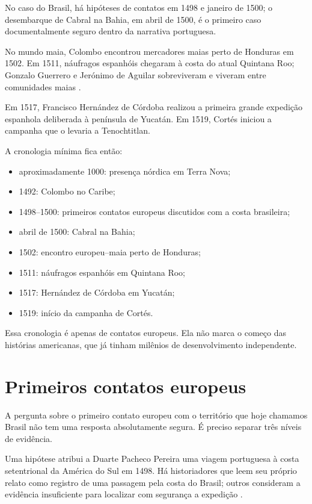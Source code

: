 No caso do Brasil, há hipóteses de contatos
em 1498 e janeiro de 1500; o desembarque de
Cabral na Bahia, em abril de 1500, é o
primeiro caso documentalmente seguro dentro
da narrativa portuguesa.

No mundo maia, Colombo encontrou mercadores
maias perto de Honduras em 1502. Em 1511,
náufragos espanhóis chegaram à costa do
atual Quintana Roo; Gonzalo Guerrero e
Jerónimo de Aguilar sobreviveram e viveram
entre comunidades maias
\cite{inah-primeiros-contatos-maias}.

Em 1517, Francisco Hernández de Córdoba
realizou a primeira grande expedição
espanhola deliberada à península de Yucatán.
Em 1519, Cortés iniciou a campanha que o
levaria a Tenochtitlan.

A cronologia mínima fica então:
\begin{itemize}
\item aproximadamente 1000: presença
nórdica em Terra Nova;
\item 1492: Colombo no Caribe;
\item 1498--1500: primeiros contatos
europeus discutidos com a costa brasileira;
\item abril de 1500: Cabral na Bahia;
\item 1502: encontro europeu--maia perto de
Honduras;
\item 1511: náufragos espanhóis em
Quintana Roo;
\item 1517: Hernández de Córdoba em
Yucatán;
\item 1519: início da campanha de Cortés.
\end{itemize}

Essa cronologia é apenas de contatos
europeus. Ela não marca o começo das
histórias americanas, que já tinham
milênios de desenvolvimento independente.

\section{Primeiros contatos europeus}
\label{section-primeiros-contatos-europeus}

A pergunta sobre o primeiro contato europeu
com o território que hoje chamamos Brasil
não tem uma resposta absolutamente segura.
É preciso separar três níveis de evidência.

Uma hipótese atribui a Duarte Pacheco
Pereira uma viagem portuguesa à costa
setentrional da América do Sul em 1498.
Há historiadores que leem seu próprio relato
como registro de uma passagem pela costa do
Brasil; outros consideram a evidência
insuficiente para localizar com segurança a
expedição \cite{pacheco1498,disney-brazil}.

